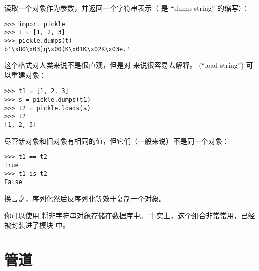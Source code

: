 {{{{{{{ 读取一个对象作为参数，并返回一个字符串表示（  是 ``dump string'' 的缩写）：

\begin{lstlisting}
>>> import pickle
>>> t = [1, 2, 3]
>>> pickle.dumps(t)
b'\x80\x03]q\x00(K\x01K\x02K\x03e.'
\end{lstlisting}

%

这个格式对人类来说不是很直观，但是对  来说很容易去解释。  (``load string'') 可以重建对象：

\begin{lstlisting}
>>> t1 = [1, 2, 3]
>>> s = pickle.dumps(t1)
>>> t2 = pickle.loads(s)
>>> t2
[1, 2, 3]
\end{lstlisting}

%

尽管新对象和旧对象有相同的值，但它们（一般来说）不是同一个对象：

\begin{lstlisting}
>>> t1 == t2
True
>>> t1 is t2
False
\end{lstlisting}

%

换言之，序列化然后反序列化等效于复制一个对象。


你可以使用  将非字符串对象存储在数据库中。
事实上，这个组合非常常用，已经被封装进了模块  中。

  

\section{管道}
  


}}}}}}}
